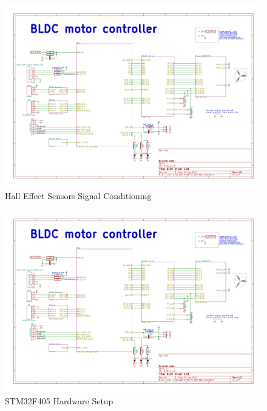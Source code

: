 \begin{figure}
    \includegraphics[width=\textwidth,page=5]{Images/BLDC_4}
    \caption{Hall Effect Sensors Signal Conditioning}
    \label{fig:sch5}
\end{figure}

\begin{figure}
    \includegraphics[width=\textwidth,page=6]{Images/BLDC_4}
    \caption{STM32F405 Hardware Setup}
    \label{fig:sch6}
\end{figure}

